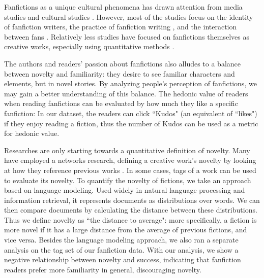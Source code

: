 \documentclass[a4paper]{article}
\begin{document}
Fanfictions as a unique cultural phenomena has drawn attention from media studies and cultural studies \cite{thomas2011fanfiction}. However, most of the studies focus on the identity of fanfiction writers\cite{black2006language}, the practice of fanfiction writing \cite{LIT:LIT12061}, and the interaction between fans \cite{hills2015expertise}. Relatively less studies have focused on fanfictions themselves as creative works, especially using quantitative methods\cite{zhaopredicting} \cite{yung2013market}.

The authors and readers' passion about fanfictions also alludes to a balance between novelty and familiarity: they desire to see familiar characters and elements, but in novel stories. By analyzing people's perception of fanfictions, we may gain a better understanding of this balance. The hedonic value of readers when reading fanfictions can be evaluated by how much they like a specific fanfiction:  In our dataset, the readers can click ``Kudos" (an equivalent of ``likes") if they enjoy reading a fiction, thus the number of Kudos can be used as a metric for hedonic value.

Researches are only starting towards a quantitative definition of novelty. Many have employed a networks research, defining a creative work's novelty by looking at how they reference previous works \cite{elgammal2015quantifying}\cite{wang2013quantifying}\cite{2017arXiv170704239I}. In some cases, tags of a work can be used to evaluate its novelty\cite{sreenivasan2013quantitative}. To quantify the novelty of fictions, we take an approach based on language modeling. Used widely in natural language processing and information retrieval\cite{jurafsky2000speech}\cite{Ponte:1998:LMA:290941.291008}, it represents documents as distributions over words. We can then compare documents by calculating the distance between these distributions. Thus we define novelty as ``the distance to average": more specifically, a fiction is more novel if it has a large distance from the average of previous fictions, and vice versa. Besides the language modeling approach, we also ran a separate analysis on the tag set of our fanfiction data. With our analysis, we show a negative relationship between novelty and success, indicating that fanfiction readers prefer more familiarity in general, discouraging novelty.
\end{document}
